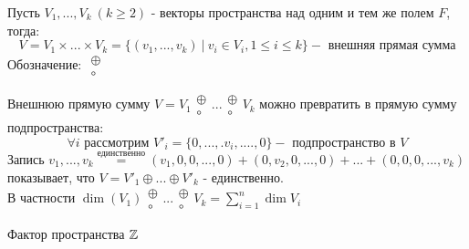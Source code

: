     \begin{definition}
        Пусть $V_1,...,V_k \ (k\geq 2)$ - векторы пространства над одним и тем же полем $F$, тогда: 
        $$V = V_1 \times ... \times V_k = \{ (v_1,...,v_k) \ | \ v_i \in V_i, 1\leq i \leq k\} - \text{ внешняя прямая сумма}$$ 
        Обозначение: $\begin{smallmatrix}
        \oplus \\ \circ 
    \end{smallmatrix}$
    \end{definition} 
    \begin{remark}
        Внешнюю прямую сумму $V = V_1 \begin{smallmatrix}
            \oplus \\ \circ
        \end{smallmatrix} ... \begin{smallmatrix}
            \oplus \\ \circ
        \end{smallmatrix} V_k$  можно превратить в прямую сумму подпространства:
        $$\forall i \text{ рассмотрим } V'_i = \{0,...,.v_i,....,0\} - \text{ подпространство в } V$$
        Запись $v_1,...,v_k \overset{\text{единственно}}{=} (v_1,0,0,...,0) + (0,v_2,0,...,0)+...+(0,0,0,...,v_k)$ показывает, что $V = V'_1 \oplus ... \oplus V'_k$ - единственно. \\
        В частности $\dim (V_1) \begin{smallmatrix}
            \oplus \\ \circ 
        \end{smallmatrix} ... \begin{smallmatrix}
            \oplus \\ \circ 
        \end{smallmatrix} V_k = \sum \limits_{i=1}^n \dim V_i$ 
    \end{remark} 
    

    

     Фактор пространства
     $\mathbb Z$ 